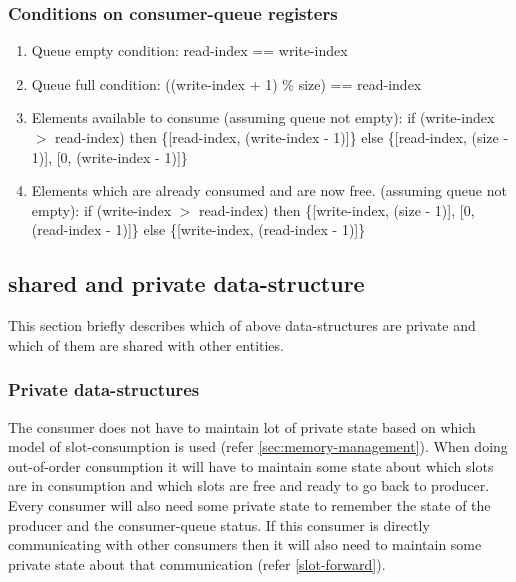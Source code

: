 \documentclass[a4paper,twoside]{report} %
\begin{document}
\subsubsection{Conditions on consumer-queue registers}

\begin{enumerate} 
  \item Queue empty condition: read-index == write-index
  \item Queue full condition: ((write-index + 1) \% size) == read-index 
  \item Elements available to consume \newline
  (assuming queue not empty):\newline
  if (write-index $>$ read-index) \newline
    then \{[read-index, (write-index - 1)]\} \newline
    else \{[read-index, (size - 1)], [0, (write-index - 1)]\}  \newline
  \item Elements which are already consumed and are now free.  \newline
  (assuming queue not empty):  \newline
  if (write-index $>$ read-index) \newline
    then \{[write-index, (size - 1)], [0, (read-index - 1)]\} \newline
    else \{[write-index, (read-index - 1)]\} \newline
\end{enumerate} 

\subsection{shared and private data-structure}
This section briefly describes which of above data-structures are
private and which of them are shared with other entities.

\subsubsection{Private data-structures}
The consumer does not have to maintain lot of private state based on
which model of slot-consumption is used (refer
\ref{sec:memory-management}).  When doing out-of-order consumption
it will have to maintain some state about which slots are in 
consumption and which slots are free and ready to go back to producer.
Every consumer will also need some private state to remember the state
of the producer and the consumer-queue status.  If this consumer is
directly communicating with other consumers then it will also need
to maintain some private state about that communication (refer
\ref{slot-forward}).
\end{document}

